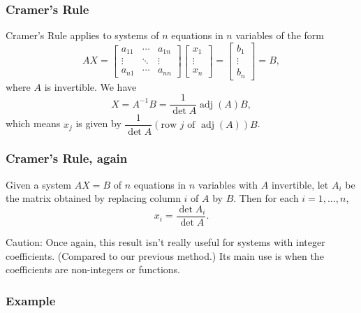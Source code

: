 \documentclass[11pt,t]{beamer}
\DeclareMathOperator{\adj}{adj}
\begin{document}
\begin{frame}
\frametitle{Cramer's Rule}

\alert{Cramer's Rule} applies to systems of $n$ equations in $n$ variables of the form
\[
AX=\begin{bmatrix}
a_{11}&\cdots&a_{1n}\\
\vdots&\ddots&\vdots\\
a_{n1}&\cdots&a_{nn}
\end{bmatrix}\begin{bmatrix}x_1\\\vdots\\x_n\end{bmatrix} = \begin{bmatrix}b_1\\\vdots\\b_n\end{bmatrix}=B,
\]
where $A$ is \alert{invertible}. We have
\[
X = A^{-1}B = \frac{1}{\det A}\adj(A)B,
\]
which means $x_j$ is given by $\dfrac{1}{\det A}(\text{row } j \text{ of } \adj(A))B$. \\

\end{frame}
\begin{frame}
\frametitle{Cramer's Rule, again}
Given a system $AX=B$ of $n$ equations in $n$ variables \alert{with $A$ invertible}, let $A_i$ be the matrix obtained by replacing column $i$ of $A$ by $B$. Then for each $i=1,\ldots, n$,
\[
x_i = \frac{\det A_i}{\det A}.
\]

\bigskip

\alert{Caution}: Once again, this result isn't really useful for systems with integer coefficients. (Compared to our previous method.) Its main use is when the coefficients are non-integers or functions.
\end{frame}
\begin{frame}
\frametitle{Example}

\end{frame}
\end{document}
